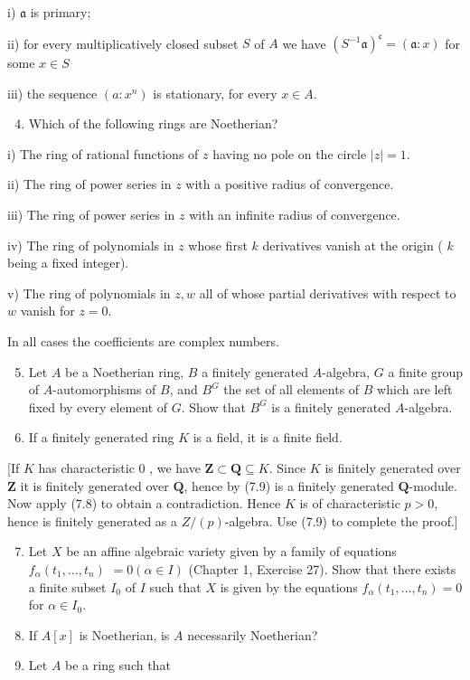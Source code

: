 \documentclass{standalone}
\theoremstyle{definition}
\theoremstyle{remark}
\begin{document}
i) $\mathfrak{a}$ is primary;

ii) for every multiplicatively closed subset $S$ of $A$ we have $\left(S^{-1} \mathfrak{a}\right)^{\mathfrak{c}}=(\mathfrak{a}: x)$ for some $x \in S$

iii) the sequence $\left(a: x^{n}\right)$ is stationary, for every $x \in A$.

\begin{enumerate}
  \setcounter{enumi}{3}
  \item Which of the following rings are Noetherian?
\end{enumerate}

i) The ring of rational functions of $z$ having no pole on the circle $|z|=1$.

ii) The ring of power series in $z$ with a positive radius of convergence.

iii) The ring of power series in $z$ with an infinite radius of convergence.

iv) The ring of polynomials in $z$ whose first $k$ derivatives vanish at the origin ( $k$ being a fixed integer).

v) The ring of polynomials in $z, w$ all of whose partial derivatives with respect to $w$ vanish for $z=0$.

In all cases the coefficients are complex numbers.

\begin{enumerate}
  \setcounter{enumi}{4}
  \item Let $A$ be a Noetherian ring, $B$ a finitely generated $A$-algebra, $G$ a finite group of $A$-automorphisms of $B$, and $B^{G}$ the set of all elements of $B$ which are left fixed by every element of $G$. Show that $B^{G}$ is a finitely generated $A$-algebra.

  \item If a finitely generated ring $K$ is a field, it is a finite field.

\end{enumerate}

[If $K$ has characteristic 0 , we have $\mathbf{Z} \subset \mathbf{Q} \subseteq K$. Since $K$ is finitely generated over $\mathbf{Z}$ it is finitely generated over $\mathbf{Q}$, hence by (7.9) is a finitely generated $\mathbf{Q}$-module. Now apply (7.8) to obtain a contradiction. Hence $K$ is of characteristic $p>0$, hence is finitely generated as a $Z /(p)$-algebra. Use (7.9) to complete the proof.]

\begin{enumerate}
  \setcounter{enumi}{6}
  \item Let $X$ be an affine algebraic variety given by a family of equations $f_{\alpha}\left(t_{1}, \ldots, t_{n}\right)$ $=0(\alpha \in I)$ (Chapter 1, Exercise 27). Show that there exists a finite subset $I_{0}$ of $I$ such that $X$ is given by the equations $f_{\alpha}\left(t_{1}, \ldots, t_{n}\right)=0$ for $\alpha \in I_{0}$.

  \item If $A[x]$ is Noetherian, is $A$ necessarily Noetherian?

  \item Let $A$ be a ring such that

\end{enumerate}
\end{document}
